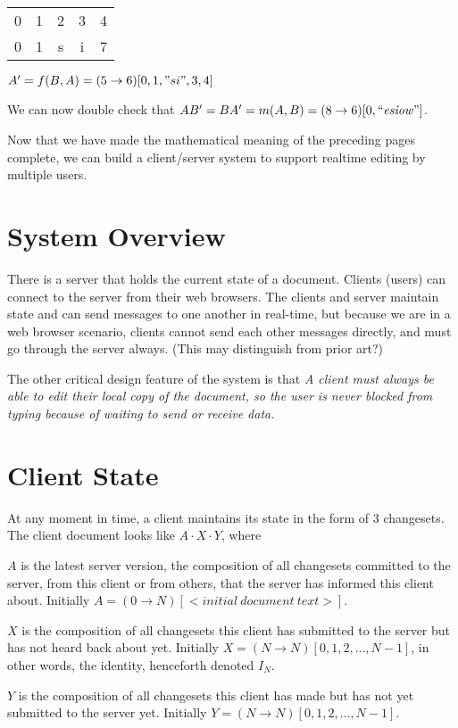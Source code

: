 \documentclass{article}
\begin{document}
\begin{tabular}{ccccc}
0 & 1 & 2 & 3 & 4 \\
0 & 1 & s & i & 7
\end{tabular}

$A'=f(B,A)=(5\rightarrow 6)[0,1,"si",3,4]$

We can now double check that $AB'=BA'=m(A,B)=(8\rightarrow 6)[0,``\mathit{esiow}"]$.

Now that we have made the mathematical meaning of the
preceding pages complete, we can build a client/server
system to support realtime editing by multiple users.

\section{System Overview}

There is a server that holds the current state of a
document.  Clients (users) can connect to the server from
their web browsers.  The clients and server maintain state
and can send messages to one another in real-time, but
because we are in a web browser scenario, clients cannot
send each other messages directly, and must go through the
server always.  (This may distinguish from prior art?)

The other critical design feature of the system is that
\emph{A client must always be able to edit their local
  copy of the document, so the user is never blocked from
  typing because of waiting to send or receive data.}

\section{Client State}

At any moment in time, a client maintains its state in the
form of 3 changesets.  The client document looks like
$A\cdot X \cdot Y$, where

$A$ is the latest server version, the composition of all
changesets committed to the server, from this client or
from others, that the server has informed this client
about.  Initially $A=(0\rightarrow N)[<\mathit{initial\ document\ text}>]$.

$X$ is the composition of all changesets this client has
submitted to the server but has not heard back about yet.
Initially $X=(N\rightarrow N)[0,1,2,\ldots, N-1]$, in
other words, the identity, henceforth denoted $I_N$.

$Y$ is the composition of all changesets this client has
made but has not yet submitted to the server yet.
Initially $Y=(N\rightarrow N)[0,1,2,\ldots, N-1]$.
\end{document}
